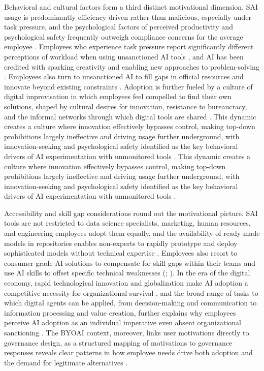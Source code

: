 \documentclass[12pt,oneside]{article}
\begin{document}
Behavioral and cultural factors form a third distinct motivational dimension. \ac{SAI} usage is predominantly efficiency-driven rather than malicious, especially under task pressure, and the psychological factors of perceived productivity and psychological safety frequently outweigh compliance concerns for the average employee \citep[1140, 1136]{raizada2026shadowai}. Employees who experience task pressure report significantly different perceptions of workload when using unsanctioned \ac{AI} tools \citep[5]{varshini2025facing}, and \ac{AI} has been credited with sparking creativity and enabling new approaches to problem-solving \citep[9]{silic2025shadow}. Employees also turn to unsanctioned \ac{AI} to fill gaps in official resources and innovate beyond existing constraints \citep[1]{varshini2025facing}. Adoption is further fueled by a culture of digital improvisation in which employees feel compelled to find their own solutions, shaped by cultural desires for innovation, resistance to bureaucracy, and the informal networks through which digital tools are shared \citep[1, 3]{ross2025shadowai}. This dynamic creates a culture where innovation effectively bypasses control, making top-down prohibitions largely ineffective and driving usage further underground, with innovation-seeking and psychological safety identified as the key behavioral drivers of \ac{AI} experimentation with unmonitored tools \citep[1136, 1138]{raizada2026shadowai}. This dynamic creates a culture where innovation effectively bypasses control, making top-down prohibitions largely ineffective and driving usage further underground, with innovation-seeking and psychological safety identified as the key behavioral drivers of \ac{AI} experimentation with unmonitored tools \citep[1136, 1138]{raizada2026shadowai}.

Accessibility and skill gap considerations round out the motivational picture. \ac{SAI} tools are not restricted to data science specialists, marketing, human resources, and engineering employees adopt them equally, and the availability of ready-made models in repositories enables non-experts to rapidly prototype and deploy sophisticated models without technical expertise \citep[973]{puthal2025shadowai}. Employees also resort to consumer-grade \ac{AI} solutions to compensate for skill gaps within their teams and use \ac{AI} skills to offset specific technical weaknesses (\citealp[1-2]{ross2025shadowai}; \citealp[3]{an2024impact}). In the era of the digital economy, rapid technological innovation and globalization make \ac{AI} adoption a competitive necessity for organizational survival \citep[1]{an2024impact}, and the broad range of tasks to which digital agents can be applied, from decision-making and communication to information processing and value creation, further explains why employees perceive \ac{AI} adoption as an individual imperative even absent organizational sanctioning \citep[11]{alter2024updated}. The \ac{BYOAI} context, moreover, links user motivations directly to governance design, as a structured mapping of motivations to governance responses reveals clear patterns in how employee needs drive both adoption and the demand for legitimate alternatives \citep[2708, 2709]{anthuvan2025byoai}.
\end{document}
